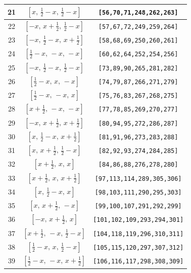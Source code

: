\documentclass[fleqn,8pt]{jsarticle}
\begin{document}
\begin{longtable}{ccc}
21 & $\left[ x,\, \frac{1}{2} - x,\, \frac{1}{2} - x \right]$ & {\tt [56,70,71,248,262,263]} \\ \hline
22 & $\left[ - x,\, x + \frac{1}{2},\, \frac{1}{2} - x \right]$ & {\tt [57,67,72,249,259,264]} \\ \hline
23 & $\left[ - x,\, \frac{1}{2} - x,\, x + \frac{1}{2} \right]$ & {\tt [58,68,69,250,260,261]} \\ \hline
24 & $\left[ \frac{1}{2} - x,\, - x,\, - x \right]$ & {\tt [60,62,64,252,254,256]} \\ \hline
25 & $\left[ - x,\, \frac{1}{2} - x,\, \frac{1}{2} - x \right]$ & {\tt [73,89,90,265,281,282]} \\ \hline
26 & $\left[ \frac{1}{2} - x,\, x,\, - x \right]$ & {\tt [74,79,87,266,271,279]} \\ \hline
27 & $\left[ \frac{1}{2} - x,\, - x,\, x \right]$ & {\tt [75,76,83,267,268,275]} \\ \hline
28 & $\left[ x + \frac{1}{2},\, - x,\, - x \right]$ & {\tt [77,78,85,269,270,277]} \\ \hline
29 & $\left[ - x,\, x + \frac{1}{2},\, x + \frac{1}{2} \right]$ & {\tt [80,94,95,272,286,287]} \\ \hline
30 & $\left[ x,\, \frac{1}{2} - x,\, x + \frac{1}{2} \right]$ & {\tt [81,91,96,273,283,288]} \\ \hline
31 & $\left[ x,\, x + \frac{1}{2},\, \frac{1}{2} - x \right]$ & {\tt [82,92,93,274,284,285]} \\ \hline
32 & $\left[ x + \frac{1}{2},\, x,\, x \right]$ & {\tt [84,86,88,276,278,280]} \\ \hline
33 & $\left[ x + \frac{1}{2},\, x,\, x + \frac{1}{2} \right]$ & {\tt [97,113,114,289,305,306]} \\ \hline
34 & $\left[ x,\, \frac{1}{2} - x,\, x \right]$ & {\tt [98,103,111,290,295,303]} \\ \hline
35 & $\left[ x,\, x + \frac{1}{2},\, - x \right]$ & {\tt [99,100,107,291,292,299]} \\ \hline
36 & $\left[ - x,\, x + \frac{1}{2},\, x \right]$ & {\tt [101,102,109,293,294,301]} \\ \hline
37 & $\left[ x + \frac{1}{2},\, - x,\, \frac{1}{2} - x \right]$ & {\tt [104,118,119,296,310,311]} \\ \hline
38 & $\left[ \frac{1}{2} - x,\, x,\, \frac{1}{2} - x \right]$ & {\tt [105,115,120,297,307,312]} \\ \hline
39 & $\left[ \frac{1}{2} - x,\, - x,\, x + \frac{1}{2} \right]$ & {\tt [106,116,117,298,308,309]} \\ \hline

\end{longtable}
\end{document}
